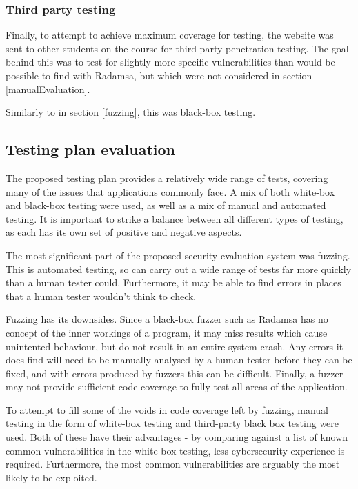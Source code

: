 \subsubsection{Third party testing}

Finally, to attempt to achieve maximum coverage for testing, the website was sent to other students on the course for third-party penetration testing. The goal behind this was to test for slightly more specific vulnerabilities than would be possible to find with Radamsa, but which were not considered in section \ref{manualEvaluation}.

Similarly to in section \ref{fuzzing}, this was black-box testing. 

\subsection{Testing plan evaluation}

The proposed testing plan provides a relatively wide range of tests, covering many of the issues that applications commonly face. A mix of both white-box and  black-box testing were used, as well as a mix of manual and automated testing. It is important to strike a balance between all different types of testing, as each has its own set of positive and negative aspects. 

The most significant part of the proposed security evaluation system was fuzzing. This is automated testing, so can carry out a wide range of tests far more quickly than a human tester could. Furthermore, it may be able to find errors in places that a human tester wouldn't think to check. 

Fuzzing has its downsides. Since a black-box fuzzer such as Radamsa has no concept of the inner workings of a program, it may miss results which cause unintented behaviour, but do not result in an entire system crash. Any errors it does find will need to be manually analysed by a human tester before they can be fixed, and with errors produced by fuzzers this can be difficult. Finally, a fuzzer may not provide sufficient code coverage to fully test all areas of the application. 

To attempt to fill some of the voids in code coverage left by fuzzing, manual testing in the form of white-box testing and third-party black box testing were used. Both of these have their advantages - by comparing against a list of known common vulnerabilities in the white-box testing, less cybersecurity experience is required. Furthermore, the most common vulnerabilities are arguably the most likely to be exploited. 

